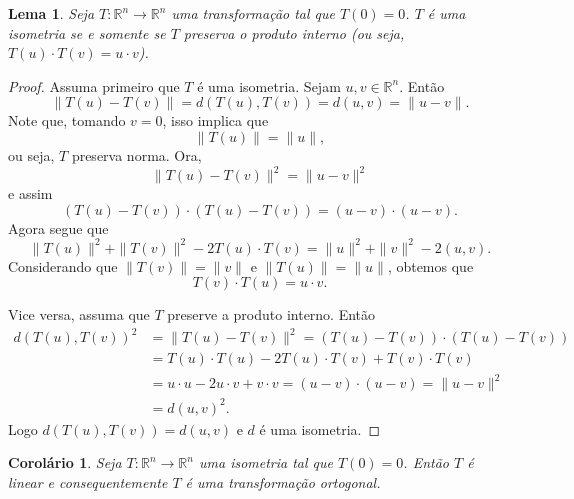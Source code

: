 \documentclass[12pt]{amsart}
\newcommand{\R}{\mathbb R}
\newtheorem{corollary}[theorem]{Corolário}
\newtheorem{lemma}[theorem]{Lema}
\theoremstyle{definition}
\begin{document}
\begin{lemma}
    Seja $T:\R^n\to\R^n$ uma transformação tal que $T(0)=0$. $T$ é uma isometria se e somente se 
    $T$ preserva o produto interno (ou seja, $T(u)\cdot T(v)=u\cdot v$). 
\end{lemma}
\begin{proof}
Assuma primeiro que $T$ é uma isometria. Sejam $u,v\in \R^n$. Então
\[
    \|T(u)-T(v)\|=d(T(u),T(v))=d(u,v)=\|u-v\|.
\]  
Note que, tomando $v=0$, isso implica que 
\[
\|T(u)\|=\|u\|,
\]
ou seja, $T$ preserva norma.
Ora,
\[
    \|T(u)-T(v)\|^2=\|u-v\|^2
\]
e assim 
\[
    (T(u)-T(v))\cdot (T(u)-T(v))=(u-v)\cdot (u-v).
\]
Agora segue que 
\[
    \|T(u)\|^2+\|T(v)\|^2-2T(u)\cdot T(v)=\|u\|^2+\|v\|^2-2(u,v).
\]
Considerando que $\|T(v)\|=\|v\|$ e $\|T(u)\|=\|u\|$, obtemos que 
\[
T(v)\cdot T(u)=u\cdot v.
\]

Vice versa, assuma que $T$ preserve a produto interno. Então 
\begin{align*}
    d(T(u),T(v))^2&=\|T(u)-T(v)\|^2=(T(u)-T(v))\cdot (T(u)-T(v))\\&=
    T(u)\cdot T(u)-2T(u)\cdot T(v)+T(v)\cdot T(v)\\&=
    u\cdot u-2u\cdot v+v\cdot v=(u-v)\cdot(u-v)=\|u-v\|^2\\&=d(u,v)^2.
\end{align*}
Logo $d(T(u),T(v))=d(u,v)$ e $d$ é uma isometria.
\end{proof}
\begin{corollary}
    Seja $T:\R^n\to \R^n$ uma isometria tal que $T(0)=0$. Então $T$ é linear e consequentemente $T$ é uma 
    transformação ortogonal.
\end{corollary}
\end{document}

